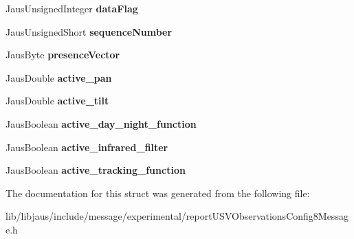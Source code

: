 \begin{DoxyCompactItemize}
\item 
\hypertarget{struct_report_u_s_v_observations_config8_message_struct_abd61491369486dc82dac9b5d82f6207c}{\-Jaus\-Unsigned\-Integer {\bfseries data\-Flag}}\label{struct_report_u_s_v_observations_config8_message_struct_abd61491369486dc82dac9b5d82f6207c}

\item 
\hypertarget{struct_report_u_s_v_observations_config8_message_struct_a1b24421f8826a2c54a35487c5d0511ee}{\-Jaus\-Unsigned\-Short {\bfseries sequence\-Number}}\label{struct_report_u_s_v_observations_config8_message_struct_a1b24421f8826a2c54a35487c5d0511ee}

\item 
\hypertarget{struct_report_u_s_v_observations_config8_message_struct_a15b33e8687e531ab47722ed681070672}{\-Jaus\-Byte {\bfseries presence\-Vector}}\label{struct_report_u_s_v_observations_config8_message_struct_a15b33e8687e531ab47722ed681070672}

\item 
\hypertarget{struct_report_u_s_v_observations_config8_message_struct_a98ce03fa65b65ea3aaee193b39c2747f}{\-Jaus\-Double {\bfseries active\-\_\-pan}}\label{struct_report_u_s_v_observations_config8_message_struct_a98ce03fa65b65ea3aaee193b39c2747f}

\item 
\hypertarget{struct_report_u_s_v_observations_config8_message_struct_ac715f7051dbb8d04874b5f8c53ffa8f4}{\-Jaus\-Double {\bfseries active\-\_\-tilt}}\label{struct_report_u_s_v_observations_config8_message_struct_ac715f7051dbb8d04874b5f8c53ffa8f4}

\item 
\hypertarget{struct_report_u_s_v_observations_config8_message_struct_a09a52125edebb358e8473d4731b31db7}{\-Jaus\-Boolean {\bfseries active\-\_\-day\-\_\-night\-\_\-function}}\label{struct_report_u_s_v_observations_config8_message_struct_a09a52125edebb358e8473d4731b31db7}

\item 
\hypertarget{struct_report_u_s_v_observations_config8_message_struct_a723668e73a44cb6dcb5911cc6db3fdfc}{\-Jaus\-Boolean {\bfseries active\-\_\-infrared\-\_\-filter}}\label{struct_report_u_s_v_observations_config8_message_struct_a723668e73a44cb6dcb5911cc6db3fdfc}

\item 
\hypertarget{struct_report_u_s_v_observations_config8_message_struct_a471fdb0e5ee2f183def3fab76e985cfa}{\-Jaus\-Boolean {\bfseries active\-\_\-tracking\-\_\-function}}\label{struct_report_u_s_v_observations_config8_message_struct_a471fdb0e5ee2f183def3fab76e985cfa}

\end{DoxyCompactItemize}


\-The documentation for this struct was generated from the following file\-:\begin{DoxyCompactItemize}
\item 
lib/libjaus/include/message/experimental/report\-U\-S\-V\-Observations\-Config8\-Message.\-h\end{DoxyCompactItemize}
